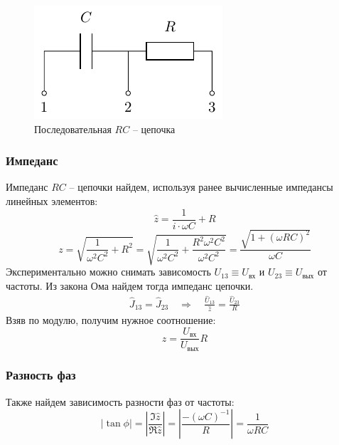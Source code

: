 \begin{figure}[H]
	\centering
	\includegraphics[]{chems/chem1}
	\caption{Последовательная $RC$ -- цепочка}
	\label{fig:RC}
\end{figure}

\subsubsection{Импеданс}
    
Импеданс $RC$ -- цепочки найдем, используя ранее вычисленные 
импедансы линейных элементов:
\begin{equation}
	\hat{z}=\frac{1}{i\cdot\omega C}+R
\end{equation}
\begin{equation}
	z=\sqrt{
		\frac{1}{\omega^2 C^2}	
		+R^2
	}=
	\sqrt{
		\frac{1}{\omega^2 C^2}	
		+\frac{R^2\omega^2 C^2}{\omega^2 C^2}
	}=\frac{\sqrt{1+(\omega RC)^2}}{\omega C}
\end{equation}
Экспериментально можно снимать зависомость $U_{13}\equiv U_\text{вх}$ и $U_{23}\equiv U_\text{вых}$ от частоты. Из закона Ома найдем тогда импеданс цепочки.
\begin{gather}
	\hat{J}_{13}=\hat{J}_{23} \quad\Rightarrow\quad
	\frac{\hat{U}_{13}}{\hat{z}}=\frac{\hat{U}_{23}}{R}
\end{gather}
Взяв по модулю, получим нужное соотношение:
\begin{equation}
	z=\frac{U_\text{вх}}{U_\text{вых}}R
\end{equation}

\subsubsection{Разность фаз}
Также найдем зависимость разности фаз от частоты:
\begin{equation}
	|\tan\phi| = |\frac{\Im\hat{z}}{\Re\hat{z}}|=
	|\frac{
		-(\omega C)^{-1}
	}{
		R
	}|=
	\frac{
		1
	}{
		\omega RC
	}	
\end{equation}

